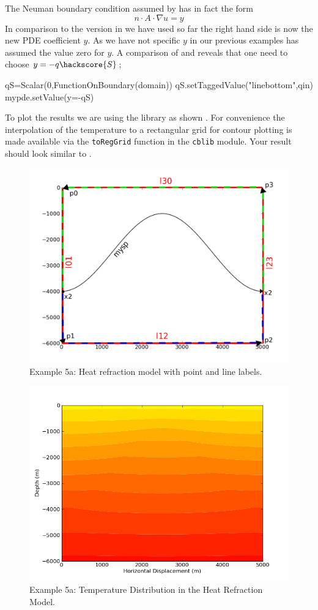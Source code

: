 The Neuman boundary condition assumed by \esc has in fact the form
\begin{equation}\label{NEUMAN 2b}
n\cdot A \cdot\nabla u = y 
\end{equation}
In comparison to the version in  we have used so far the right hand side is now 
the new PDE coefficient $y$. As we have not specific $y$ in our previous examples \esc has assumed
the value zero for $y$. A comparison of  and  reveals that one need to
choose $y=-q\hackscore{S}$;
\begin{python}
qS=Scalar(0,FunctionOnBoundary(domain))
qS.setTaggedValue("linebottom",qin)
mypde.setValue(y=-qS)
\end{python}
To plot the results we are using the \modmpl library as shown . For convenience
the interpolation of the temperature to a rectangular grid for contour plotting is made available
via the \verb|toRegGrid| function in the \verb|cblib| module. Your result should look similar to 
.

\begin{figure}[ht]
\centerline{\includegraphics[width=4.in]{figures/anticlineheatrefraction}}
\caption{Example 5a: Heat refraction model with point and line labels.}
\label{fig:anticlinehrmodel}
\end{figure}

\begin{figure}[ht]
\centerline{\includegraphics[width=4.in]{figures/heatrefraction}}
\caption{Example 5a: Temperature Distribution in the Heat Refraction Model.}
\label{fig:anticlinetemp}
\end{figure}

